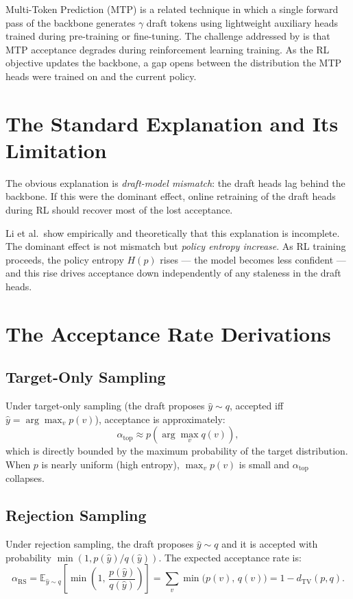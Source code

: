 \documentclass[11pt, a4paper, openany]{book}
\theoremstyle{plain}
\theoremstyle{definition}
\theoremstyle{remark}
\newcommand{\TV}{d_{\mathrm{TV}}}
\newcommand{\RS}{\alpha_{\mathrm{RS}}}
\newcommand{\E}{\mathbb{E}}
\begin{document}
Multi-Token Prediction (MTP) is a related technique in which a single
forward pass of the backbone generates $\gamma$ draft tokens using
lightweight auxiliary heads trained during pre-training or fine-tuning.
The challenge addressed by \cite{li2026breaking} is that MTP acceptance
degrades during reinforcement learning training.
As the RL objective updates the backbone, a gap opens between the
distribution the MTP heads were trained on and the current policy.

\section{The Standard Explanation and Its Limitation}

The obvious explanation is \emph{draft-model mismatch}: the draft heads
lag behind the backbone.
If this were the dominant effect, online retraining of the draft heads
during RL should recover most of the lost acceptance.

Li et al.\ show empirically and theoretically that this explanation is
incomplete.
The dominant effect is not mismatch but \emph{policy entropy increase}.
As RL training proceeds, the policy entropy $H(p)$ rises --- the model
becomes less confident --- and this rise drives acceptance down independently
of any staleness in the draft heads.

\section{The Acceptance Rate Derivations}

\subsection{Target-Only Sampling}

Under target-only sampling (the draft proposes $\hat{y} \sim q$,
accepted iff $\hat{y} = \arg\max_v p(v)$), acceptance is approximately:
\[
  \alpha_{\mathrm{top}} \approx p\!\left(\arg\max_v q(v)\right),
\]
which is directly bounded by the maximum probability of the target distribution.
When $p$ is nearly uniform (high entropy), $\max_v p(v)$ is small and
$\alpha_{\mathrm{top}}$ collapses.

\subsection{Rejection Sampling}

Under rejection sampling, the draft proposes $\hat{y} \sim q$ and it is
accepted with probability $\min(1, p(\hat{y})/q(\hat{y}))$.
The expected acceptance rate is:
\begin{equation}
  \RS
  = \E_{\hat{y} \sim q}\!\left[\min\!\left(1,\, \frac{p(\hat{y})}{q(\hat{y})}\right)\right]
  = \sum_v \min\!\bigl(p(v),\, q(v)\bigr)
  = 1 - \TV(p, q).
  \label{eq:rs-acceptance}
\end{equation}
\end{document}
